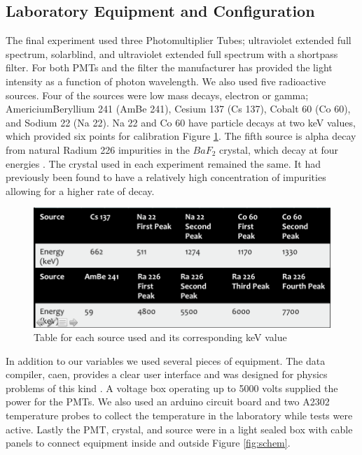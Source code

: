 \documentclass[aip, jmp, amssymb, amsmath, reprint, floatfix]{revtex4-1}
\begin{document}
\subsection{\label{sec:level2}Laboratory Equipment and Configuration}

The final experiment used three Photomultiplier Tubes; ultraviolet extended full spectrum, solarblind, and ultraviolet extended full spectrum with a shortpass filter. For both PMTs and the filter the manufacturer has provided the light intensity as a function of photon wavelength. We also used five radioactive sources. Four of the sources were low mass decays, electron or gamma; AmericiumBeryllium 241 (AmBe 241), Cesium 137 (Cs 137), Cobalt 60 (Co 60), and Sodium 22 (Na 22). Na 22 and Co 60 have particle decays at two keV values, which provided six points for calibration Figure \ref{fig:knownvalues}. The fifth source is alpha decay from natural Radium 226 impurities in the $BaF_2$ crystal, which decay at four energies \cite{Ra226}. The crystal used in each experiment remained the same. It had previously been found to have a relatively high concentration of impurities allowing for a higher rate of decay. 

\begin{figure}
  \centering
    \includegraphics[width=.8\columnwidth]{knownkev.png}
  \caption{Table for each source used and its corresponding keV value}
  \label{fig:knownvalues}
\end{figure} 


In addition to our variables we used several pieces of equipment. The data compiler, caen, provides a clear user interface and was designed for physics problems of this kind \cite{caen}. A voltage box operating up to 5000 volts supplied the power for the PMTs. We also used an arduino circuit board and two A2302 temperature probes to collect the temperature in the laboratory while tests were active. Lastly the PMT, crystal, and source were in a light sealed box with cable panels to connect equipment inside and outside Figure \ref{fig:schem}. 
\end{document}

